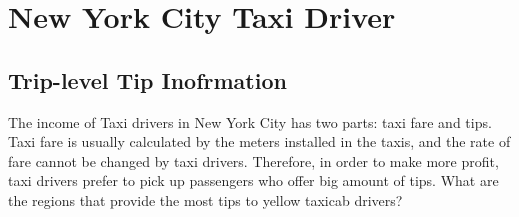 \documentclass[12pt,twoside]{reedthesis}
\theoremstyle{definition}
\theoremstyle{definition}
\theoremstyle{definition}
\theoremstyle{remark}
\begin{document}
\chapter{New York City Taxi Driver}\label{chapter3}

\section{Trip-level Tip Inofrmation}\label{trip-level-tip-inofrmation}

The income of Taxi drivers in New York City has two parts: taxi fare and
tips. Taxi fare is usually calculated by the meters installed in the
taxis, and the rate of fare cannot be changed by taxi drivers.
Therefore, in order to make more profit, taxi drivers prefer to pick up
passengers who offer big amount of tips. What are the regions that
provide the most tips to yellow taxicab drivers?
\end{document}
